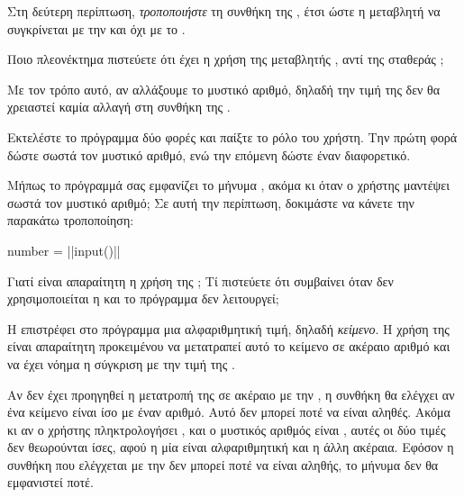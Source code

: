 \documentclass[a4paper,11pt,oneside]{book}
\begin{document}
\begin{step}
Στη δεύτερη περίπτωση, \emph{τροποποιήστε} τη συνθήκη της , έτσι ώστε η μεταβλητή  να συγκρίνεται με την  και όχι με το .

Ποιο πλεονέκτημα πιστεύετε ότι έχει η χρήση της μεταβλητής , αντί της σταθεράς ;

\begin{answer}
Με τον τρόπο αυτό, αν αλλάξουμε το μυστικό αριθμό, δηλαδή την τιμή της  δεν θα χρειαστεί καμία αλλαγή στη συνθήκη της .
\end{answer}
\end{step}

\begin{step}
Εκτελέστε το πρόγραμμα δύο φορές και παίξτε το ρόλο του χρήστη. Την πρώτη φορά δώστε σωστά τον μυστικό αριθμό, ενώ την επόμενη δώστε έναν διαφορετικό. 

Μήπως το πρόγραμμά σας εμφανίζει το μήνυμα , ακόμα κι όταν ο χρήστης μαντέψει σωστά τον μυστικό αριθμό; Σε αυτή την περίπτωση, δοκιμάστε να κάνετε την παρακάτω τροποποίηση:

\marginnote[14pt]{\iconcaution}
\begin{pyplain}
number = ||input()|\pyhighlight{)}|
\end{pyplain}

Γιατί είναι απαραίτητη η χρήση της ; Τί πιστεύετε ότι συμβαίνει όταν δεν χρησιμοποιείται η  και το πρόγραμμα δεν λειτουργεί;

\clearpage
\begin{answer}
Η  επιστρέφει στο πρόγραμμα μια αλφαριθμητική τιμή, δηλαδή \emph{κείμενο}. Η χρήση της  είναι απαραίτητη προκειμένου να μετατραπεί αυτό το κείμενο σε ακέραιο αριθμό και να έχει νόημα η σύγκριση με την τιμή της . 

Αν δεν έχει προηγηθεί η μετατροπή της  σε ακέραιο με την , η συνθήκη  θα ελέγχει αν ένα κείμενο είναι ίσο με έναν αριθμό. Αυτό δεν μπορεί ποτέ να είναι αληθές. Ακόμα κι αν ο χρήστης πληκτρολογήσει , και ο μυστικός αριθμός είναι , αυτές οι δύο τιμές δεν θεωρούνται ίσες, αφού η μία είναι αλφαριθμητική και η άλλη ακέραια. Εφόσον η συνθήκη που ελέγχεται με την  δεν μπορεί ποτέ να είναι αληθής, το μήνυμα  δεν θα εμφανιστεί ποτέ.
\end{answer}
\end{step}
\end{document}
